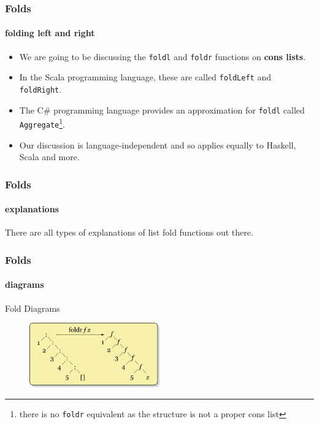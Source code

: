 \begin{frame}
\frametitle{Folds}
\framesubtitle{folding left and right}

\begin{itemize}
\item We are going to be discussing the \lstinline[basicstyle=\ttfamily]$foldl$ and \lstinline[basicstyle=\ttfamily]$foldr$ functions on \textbf{cons lists}.
\item In the Scala programming language, these are called \lstinline[basicstyle=\ttfamily]$foldLeft$ and \lstinline[basicstyle=\ttfamily]$foldRight$.
\item The C\# programming language provides an approximation for \lstinline[basicstyle=\ttfamily]$foldl$ called \lstinline[basicstyle=\ttfamily]$Aggregate$\footnote{there is no \lstinline[basicstyle=\ttfamily]$foldr$ equivalent as the structure is not a proper cons list}.
\item Our discussion is language-independent and so applies equally to Haskell, Scala and more. 
\end{itemize}

\end{frame}


\begin{frame}
\frametitle{Folds}
\framesubtitle{explanations}

\center
There are all types of explanations of list fold functions out there.

\end{frame}


\begin{frame}
\frametitle{Folds}
\framesubtitle{diagrams}

\begin{block}{Fold Diagrams}

\begin{figure}
\includegraphics[width=0.5\textwidth,natwidth=320,natheight=158]{res/image/Right-fold-transformation.png}
\end{figure}

\end{block}

\end{frame}


